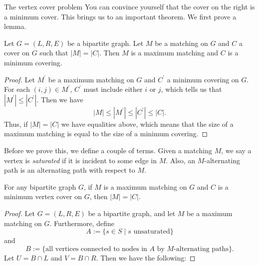 \documentclass[11pt]{article}
\renewcommand{\'}{^{'}}
\newenvironment{theorem}[2][Theorem]{\begin{trivlist}
\item[\hskip \labelsep {\bfseries #1}\hskip \labelsep {\bfseries #2.}]}{\end{trivlist}}
\newenvironment{lemma}[2][Lemma]{\begin{trivlist}
\item[\hskip \labelsep {\bfseries #1}\hskip \labelsep {\bfseries #2.}]}{\end{trivlist}}
\begin{document}
\begin{section}{The vertex cover problem}
	You can convince yourself that the cover on the right is a minimum cover. This brings us 
	to an important theorem. We first prove a lemma.

	\begin{lemma}{1}
		Let $G=(L,R,E)$ be a bipartite graph. Let $M$ be a matching on $G$ and $C$ a cover on 
		$G$ such that $|M| = |C|$. Then $M$ is a maximum matching and $C$ is a minimum 
		covering.
	\end{lemma}

	\begin{proof}
		Let $M\'$ be a maximum matching on $G$ and $C\'$ a minimum covering on $G$. For each 
		$(i,j)\in M\'$, $C\'$ must include either $i$ or $j$, which tells us that 
		$|M\'| \leq |C\'|$. Then we have 
		\[
			|M|\leq |M\'| \leq |C\'| \leq |C|.
		\]
		Thus, if $|M| = |C|$ we have equalities above, which means that the size of a maximum 
		matching is equal to the size of a minimum covering.
	\end{proof}

	Before we prove this, we define a couple of terms. Given a matching $M$, we say a vertex is 
	\emph{saturated} if it is incident to some edge in $M$. Also, an $M$-alternating path is 
	an alternating path with respect to $M$.

	\begin{theorem}{(K\H{o}nig-Egervary)}
		For any bipartite graph $G$, if $M$ is a maximum matching on $G$ and $C$ is a minimum 
		vertex cover  on $G$, then $|M| = |C|$.
	\end{theorem}

	\begin{proof}
		Let $G=(L,R,E)$ be a bipartite graph, and let $M$ be a maximum matching on $G$. 
		Furthermore, define
		\[
			A := \{s\in S\; |\; s \text{ unsaturated}\}
		\]
		and
		\[
			B := \{\text{all vertices connected to nodes in $A$ by $M$-alternating paths}\}
			.
		\]
		Let $U = B\cap L$ and $V = B\cap R$. Then we have the following:


\end{proof}
\end{section}
\end{document}
